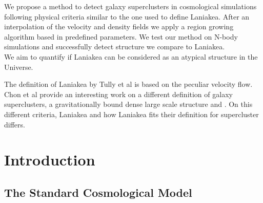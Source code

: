 \documentclass[12pt]{article}
\begin{document}
\begin{par}
We propose a method to detect galaxy superclusters in
 cosmological simulations following physical criteria
  similar to the one used to define Laniakea. After an
   interpolation of the velocity and density fields we
    apply a region growing algorithm based in predefined
     parameters. We test our method on N-body simulations
      and successfully detect structure we compare to
       Laniakea.\\
We aim to quantify if Laniakea can be
 considered as an atypical structure in
the Universe.   
\\
\end{par}

\begin{par}
The definition of Laniakea by Tully et al
 \cite{tully_laniakea_2014} is based on the
  peculiar velocity flow. Chon et al provide an
   interesting work on a different definition of
    galaxy superclusters, a gravitationally bound
     dense large scale structure
      \cite{chon_characterising_2014} and
       \cite{chon_definition_2015}. On this
        different criteria, Laniakea and how
         Laniakea fits their definition for supercluster
          differs.  \\
\end{par}
\section{Introduction}
\subsection{The Standard Cosmological Model}
\label{cosmo_constants}
\end{document}
